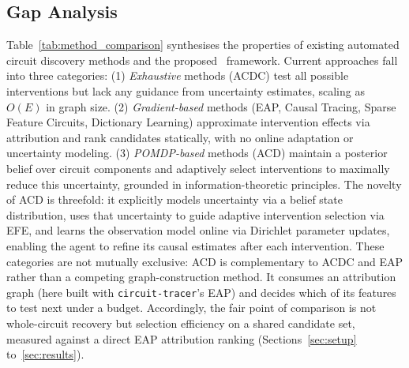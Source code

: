 \subsection{Gap Analysis}

Table~\ref{tab:method_comparison} synthesises the properties of existing automated
circuit discovery methods and the proposed \ACD\ framework. Current approaches fall
into three categories: (1) \emph{Exhaustive} methods (ACDC) test all possible
interventions but lack any guidance from uncertainty estimates, scaling as $O(E)$ in
graph size. (2) \emph{Gradient-based} methods (EAP, Causal Tracing, Sparse Feature
Circuits, Dictionary Learning) approximate intervention effects via attribution and
rank candidates statically, with no online adaptation or uncertainty modeling. (3)
\emph{POMDP-based} methods (ACD) maintain a posterior belief over circuit components
and adaptively select interventions to maximally reduce this uncertainty, grounded in
information-theoretic principles. The novelty of ACD is threefold: it explicitly
models uncertainty via a belief state distribution, uses that uncertainty to guide
adaptive intervention selection via EFE, and learns the observation model online via
Dirichlet parameter updates, enabling the agent to refine its causal estimates after
each intervention. These categories are not mutually exclusive: ACD is
complementary to ACDC and EAP rather than a competing graph-construction
method. It consumes an attribution graph (here built with \texttt{circuit-tracer}'s
EAP) and decides which of its features to test next under a budget. Accordingly, the
fair point of comparison is not whole-circuit recovery but selection efficiency
on a shared candidate set, measured against a direct EAP attribution ranking
(Sections~\ref{sec:setup} to~\ref{sec:results}).

\begin{table}[H]
  \centering
  \caption{Comparison of automated circuit discovery methods.}
  \label{tab:method_comparison}
  \small
\end{table}

